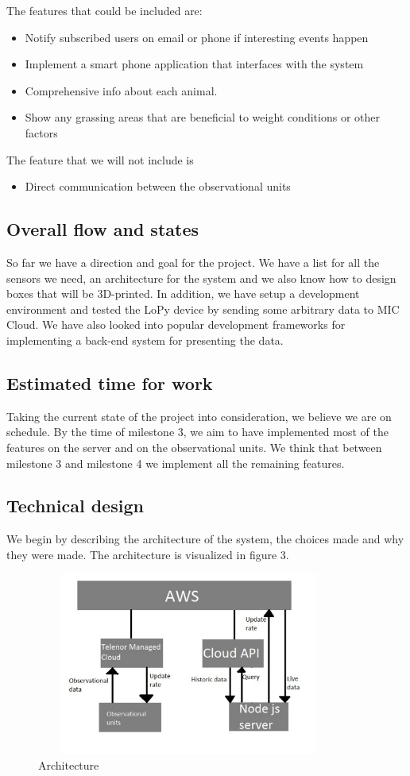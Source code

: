 		The features that could be included are:
		\begin{itemize}  
			\item Notify subscribed users on email or phone if interesting events happen
			\item Implement a smart phone application that interfaces with the system
			\item Comprehensive info about each animal.
			\item Show any grassing areas that are beneficial to weight conditions or other factors
		\end{itemize}
		
		The feature that we will not include is 
		\begin{itemize}
			\item Direct communication between the observational units
		\end{itemize}

	\subsection{Overall flow and states}
		So far we have a direction and goal for the project. We have a list for all the sensors we need, an architecture for the system and we also know how to design boxes that will be 3D-printed. In addition, we have setup a development environment and tested the LoPy device by sending some arbitrary data to MIC Cloud. We have also looked into popular development frameworks for implementing a back-end system for presenting the data.
	
	\subsection{Estimated time for work}
		Taking the current state of the project into consideration, we believe we are on schedule. By the time of milestone 3, we aim to have implemented most of the features on the server and on the observational units. We think that between milestone 3 and milestone 4 we implement all the remaining features. 
		
	\subsection{Technical design}
		We begin by describing the architecture of the system, the choices made and why they were made. The architecture is visualized in figure 3. 
		
		\begin{figure}[h]
			\caption{Architecture}
			\includegraphics[width=10cm, height=6cm]{images/architecture.pdf}
		\end{figure}

